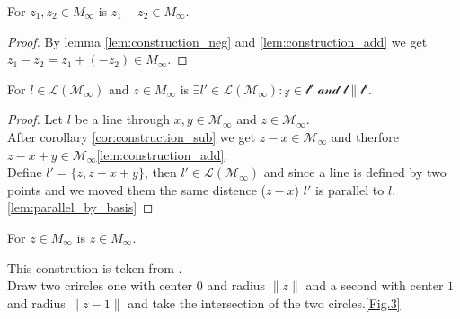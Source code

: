 \begin{corollary}
    \label{cor:construction_sub}
    \leanok
    For $z_1, z_2 \in M_{\infty}$ is $z_1 - z_2 \in M_{\infty}$.
\end{corollary}
\begin{proof}
    By lemma \ref{lem:construction_neg} and \ref{lem:construction_add} we get $z_1 - z_2 = z_1 + (-z_2) \in M_{\infty}$.
\end{proof}

\begin{corollary}
    \label{lem:construction_parallel_lines}
    \leanok
    For $l \in \mathcal{L(M_{\infty})}$ and $z \in M_{\infty}$ is $\exists l' \in \mathcal{L(M_{\infty}): z\in l' \text{ and } l\|l'}$.
\end{corollary}
\begin{proof}
    Let $l$ be a line through $x,y \in \mathcal{M_{\infty}}$ and $z \in \mathcal{M_{\infty}}$.\\
    After corollary \ref{cor:construction_sub} we get $z - x \in \mathcal{M_{\infty}}$ and therfore $z-x + y \in \mathcal{M_{\infty}}$\ref{lem:construction_add}.\\
    Define $l' = \{z, z-x+y\}$, then $l' \in \mathcal{L(M_{\infty})}$ and since a line is defined by two points and we moved them the same distence ($z-x$) $l'$ is parallel to $l$.\ref{lem:parallel_by_basis}
\end{proof}
\begin{lemma}
    \label{lem:construction_conj}
    \leanok
    For $z \in M_{\infty}$ is $\overline{z} \in M_{\infty}$.
\end{lemma}
This constrution is teken from \cite{JAN_SCHRÖER:2023}.\\
Draw two crircles one with center $0$ and radius $\|z\|$ and a second with center $1$ and radius $\|z-1\|$ and take the intersection of the two circles.\ref{Fig.3}
